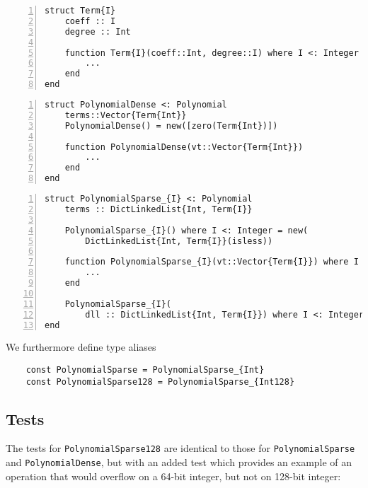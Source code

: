 \documentclass{article}
\theoremstyle{plain}
\numberwithin{theorem}{section}
\numberwithin{example}{section}
\theoremstyle{definition}
\numberwithin{definition}{section}
\begin{document}
\begin{codebox}
    \begin{Verbatim}[numbers=left,xleftmargin=5mm]
struct Term{I}
    coeff :: I
    degree :: Int

    function Term{I}(coeff::Int, degree::I) where I <: Integer
        ...
    end
end
    \end{Verbatim}
\end{codebox}

\begin{codebox}
    \begin{Verbatim}[numbers=left,xleftmargin=5mm]
struct PolynomialDense <: Polynomial
    terms::Vector{Term{Int}}   
    PolynomialDense() = new([zero(Term{Int})])

    function PolynomialDense(vt::Vector{Term{Int}})
        ...
    end
end
    \end{Verbatim}
\end{codebox}

\begin{codebox}
    \begin{Verbatim}[numbers=left,xleftmargin=5mm]
struct PolynomialSparse_{I} <: Polynomial
    terms :: DictLinkedList{Int, Term{I}}

    PolynomialSparse_{I}() where I <: Integer = new(
        DictLinkedList{Int, Term{I}}(isless))

    function PolynomialSparse_{I}(vt::Vector{Term{I}}) where I <: Integer
        ...
    end

    PolynomialSparse_{I}(
        dll :: DictLinkedList{Int, Term{I}}) where I <: Integer = new(dll)
end
    \end{Verbatim}
\end{codebox}

We furthermore define type aliases
\begin{Verbatim}
    const PolynomialSparse = PolynomialSparse_{Int}
    const PolynomialSparse128 = PolynomialSparse_{Int128}
\end{Verbatim}

\bigbreak

\subsection{Tests}
The tests for \texttt{PolynomialSparse128} are identical to those for
\texttt{PolynomialSparse} and \texttt{PolynomialDense}, but with an added test
which provides an example of an operation that would overflow on a 64-bit
integer, but not on 128-bit integer:
\end{document}
